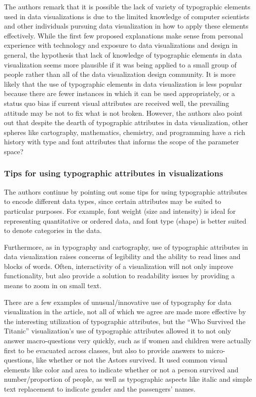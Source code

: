 \documentclass[]{book}
\begin{document}
The authors remark that it is possible the lack of variety of typographic elements used in data visualizations is due to the limited knowledge of computer scientists and other individuals pursuing data visualization in how to apply these elements effectively. While the first few proposed explanations make sense from personal experience with technology and exposure to data visualizations and design in general, the hypothesis that lack of knowledge of typographic elements in data visualization seems more plausible if it was being applied to a small group of people rather than all of the data visualization design community. It is more likely that the use of typographic elements in data visualization is less popular because there are fewer instances in which it can be used appropriately, or a status quo bias if current visual attributes are received well, the prevailing attitude may be not to fix what is not broken. However, the authors also point out that despite the dearth of typographic attributes in data visualization, other spheres like cartography, mathematics, chemistry, and programming have a rich history with type and font attributes that informs the scope of the parameter space?

\hypertarget{tips-for-using-typographic-attributes-in-visualizations}{%
\subsubsection{Tips for using typographic attributes in visualizations}\label{tips-for-using-typographic-attributes-in-visualizations}}

The authors continue by pointing out some tips for using typographic attributes to encode different data types, since certain attributes may be suited to particular purposes. For example, font weight (size and intensity) is ideal for representing quantitative or ordered data, and font type (shape) is better suited to denote categories in the data.

Furthermore, as in typography and cartography, use of typographic attributes in data visualization raises concerns of legibility and the ability to read lines and blocks of words. Often, interactivity of a visualization will not only improve functionality, but also provide a solution to readability issues by providing a means to zoom in on small text.

There are a few examples of unusual/innovative use of typography for data visualization in the article, not all of which we agree are made more effective by the interesting utilization of typographic attributes, but the ``Who Survived the Titanic'' visualization's use of typographic attributes allowed it to not only answer macro-questions very quickly, such as if women and children were actually first to be evacuated across classes, but also to provide answers to micro-questions, like whether or not the Astors survived. It used common visual elements like color and area to indicate whether or not a person survived and number/proportion of people, as well as typographic aspects like italic and simple text replacement to indicate gender and the passengers' names.
\end{document}
